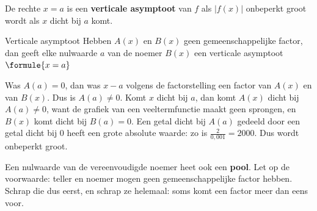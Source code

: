 
\begin{theorie}
De rechte $x = a$ is een \textbf{\textcolor{accent}{verticale asymptoot}} van $f$ als $|f(x)|$ onbeperkt groot wordt als $x$ dicht bij $a$ komt.

\begin{stelling}{Verticale asymptoot}
Hebben $A(x)$ en $B(x)$ geen gemeenschappelijke factor, dan geeft elke nulwaarde $a$ van de noemer $B(x)$ een verticale asymptoot \quad $\formule{x = a}$
\end{stelling}

\begin{bewijs}
Was $A(a) = 0$, dan was $x - a$ volgens de factorstelling een factor van $A(x)$ en van $B(x)$. Dus is $A(a) \neq 0$. Komt $x$ dicht bij $a$, dan komt $A(x)$ dicht bij $A(a) \neq 0$, want de grafiek van een veeltermfunctie maakt geen sprongen, en $B(x)$ komt dicht bij $B(a) = 0$. Een getal dicht bij $A(a)$ gedeeld door een getal dicht bij $0$ heeft een grote absolute waarde: zo is $\frac{2}{0{,}001} = 2000$. Dus wordt
onbeperkt groot.
\end{bewijs}
\end{theorie}

Een nulwaarde van de vereenvoudigde noemer heet ook een \textbf{pool}. Let op de voorwaarde: teller en noemer mogen geen gemeenschappelijke factor hebben. Schrap die dus eerst, en schrap ze helemaal: soms komt een factor meer dan eens voor.

